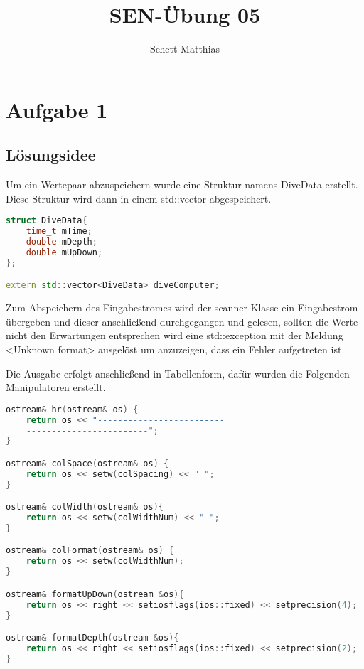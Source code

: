 \documentclass[a4paper,oneside,openany]{tufte-book}
\author{Schett Matthias}
\title{SEN-\"{U}bung 05}
\begin{document}
\setcounter{tocdepth}{1} 

\frontmatter

\maketitle
\tableofcontents
\mainmatter

\chapter{Aufgabe 1}

\section{L\"{o}sungsidee}

Um ein Wertepaar abzuspeichern wurde eine Struktur namens DiveData erstellt. Diese Struktur wird dann in einem std::vector abgespeichert.

\begin{lstlisting}[language=C++]
struct DiveData{
    time_t mTime;
    double mDepth;
    double mUpDown;
};

extern std::vector<DiveData> diveComputer;
\end{lstlisting}

Zum Abspeichern des Eingabestromes wird der scanner Klasse ein Eingabestrom übergeben und dieser anschließend durchgegangen und gelesen, sollten
die Werte nicht den Erwartungen entsprechen wird eine std::exception mit der Meldung <Unknown format> ausgelöst um anzuzeigen, dass ein Fehler aufgetreten ist.

Die Ausgabe erfolgt anschließend in Tabellenform, dafür wurden die Folgenden Manipulatoren erstellt.

\begin{lstlisting}[language=C++]
ostream& hr(ostream& os) {
    return os << "-------------------------
    ------------------------";
}

ostream& colSpace(ostream& os) {
    return os << setw(colSpacing) << " ";
}

ostream& colWidth(ostream& os){
    return os << setw(colWidthNum) << " ";
}

ostream& colFormat(ostream& os) {
    return os << setw(colWidthNum);
}

ostream& formatUpDown(ostream &os){
    return os << right << setiosflags(ios::fixed) << setprecision(4);
}

ostream& formatDepth(ostream &os){
    return os << right << setiosflags(ios::fixed) << setprecision(2);
}
\end{lstlisting}
\end{document}
